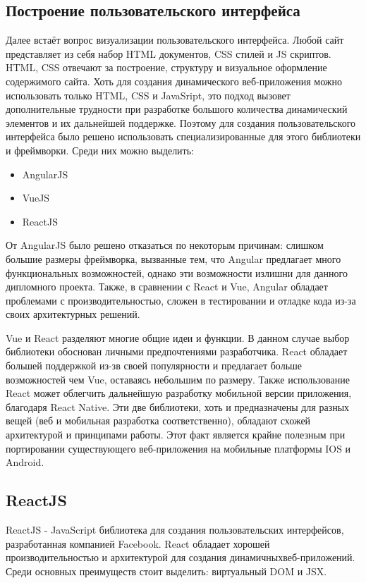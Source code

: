 \subsection{Построение пользовательского интерфейса}
Далее встаёт вопрос визуализации пользовательского интерфейса. Любой сайт представляет из себя набор HTML документов, CSS стилей и JS скриптов. 
HTML, CSS отвечают за построение, структуру и визуальное оформление содержимого сайта. 
Хоть для создания динамического веб-приложения можно использовать только HTML, CSS и JavaSript, это подход вызовет дополнительные трудности при разработке большого количества динамический элементов и их дальнейшей поддержке. 
Поэтому для создания пользовательского интерфейса было решено использовать специализированные для этого библиотеки и фреймворки.
Среди них можно выделить:
\begin{itemize}
 \item AngularJS
 \item VueJS
 \item ReactJS
\end{itemize}
 
От AngularJS было решено отказаться по некоторым причинам: слишком большие размеры фреймворка, вызванные тем, что Angular предлагает много функциональных возможностей, однако эти возможности излишни для данного дипломного проекта. 
Также, в сравнении с React и Vue, Angular обладает проблемами с производительностью, сложен в тестировании и отладке кода из-за своих архитектурных решений.

Vue и React разделяют многие общие идеи и функции.
В данном случае выбор библиотеки обоснован личными предпочтениями разработчика.
React обладает большей поддержкой из-зв своей популярности и предлагает больше возможностей чем Vue, оставаясь небольшим по размеру. 
Также использование React может облегчить дальнейшую разработку мобильной версии приложения, благодаря React Native.
Эти две библиотеки, хоть и предназначены для разных вещей (веб и мобильная разработка соответственно), обладают схожей архитектурой и принципами работы. Этот факт является крайне полезным при портировании существующего веб-приложения на мобильные платформы IOS и Android.
 
\subsection{ReactJS}
ReactJS - JavaScript библиотека для создания пользовательских интерфейсов, разработанная компанией Facebook. React обладает хорошей производительностью и архитектурой для создания динамичных\linebreak веб-приложений. Среди основных преимуществ стоит выделить: виртуальный DOM и JSX.
 
